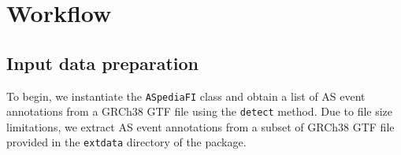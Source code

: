 \documentclass{article}\usepackage[]{graphicx}\usepackage[]{color}
\begin{document}
\section{Workflow}

\subsection{Input data preparation}
To begin, we instantiate the \texttt{ASpediaFI} class and obtain a list of
AS event annotations from a GRCh38 GTF file using the \texttt{detect} method.
Due to file size limitations, we extract AS event annotations from a subset of
GRCh38 GTF file provided in the \texttt{extdata} directory of the package.
\end{document}
